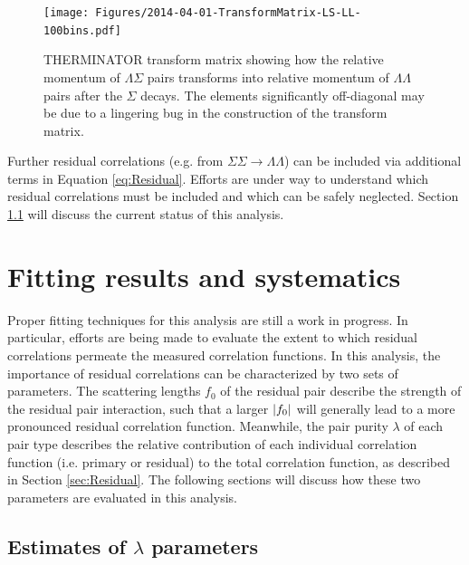 \begin{figure}[hbtp]
\texttt{[image: Figures/2014-04-01-TransformMatrix-LS-LL-100bins.pdf]}
\caption[Transform matrix for $k^*_{\Lambda\Sigma} \rightarrow k^*_{\Lambda\Lambda}$]{THERMINATOR \cite{Chojnacki:2011hb} transform matrix showing how the relative momentum of $\Lambda\Sigma$ pairs transforms into relative momentum of $\Lambda\Lambda$ pairs after the $\Sigma$ decays.  The elements significantly off-diagonal may be due to a lingering bug in the construction of the transform matrix.}
\label{fig:TherminatorLS}
\end{figure}

Further residual correlations (e.g. from $\Sigma\Sigma \rightarrow \Lambda\Lambda$) can be included via additional terms in Equation \ref{eq:Residual}.  Efforts are under way to understand which residual correlations must be included and which can be safely neglected.  Section \ref{sec:LambdaParams} will discuss the current status of this analysis. 

\section{Fitting results and systematics}
\label{sec:FittingSystematics}

Proper fitting techniques for this analysis are still a work in progress.  In particular, efforts are being made to evaluate the extent to which residual correlations permeate the measured correlation functions.  In this analysis, the importance of residual correlations can be characterized by two sets of parameters.  The scattering lengths $f_0$ of the residual pair describe the strength of the residual pair interaction, such that a larger $\left\lvert f_0\right\rvert$ will generally lead to a more pronounced residual correlation function.  Meanwhile, the pair purity $\lambda$ of each pair type describes the relative contribution of each individual correlation function (i.e. primary or residual) to the total correlation function, as described in Section \ref{sec:Residual}. The following sections will discuss how these two parameters are evaluated in this analysis.



\subsection{Estimates of $\lambda$ parameters}
\label{sec:LambdaParams}

